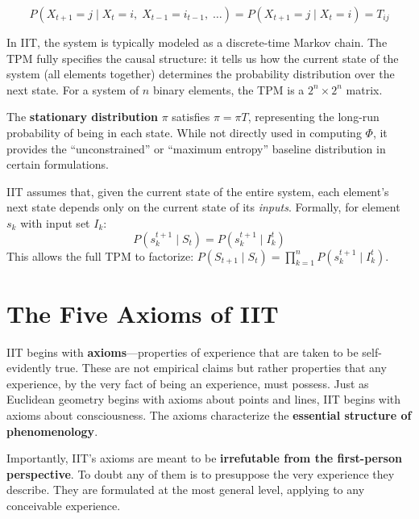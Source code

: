 \documentclass[11pt,a4paper]{report}
\newcommand{\Phi}{\varPhi}
\begin{document}
\begin{mathbox}
\vspace{-8pt}
\[
  P(X_{t+1} = j \mid X_t = i,\; X_{t-1} = i_{t-1},\; \ldots) = P(X_{t+1} = j \mid X_t = i) = T_{ij}
\]
\vspace{-10pt}
\end{mathbox}

In IIT, the system is typically modeled as a discrete-time Markov chain. The TPM fully specifies the causal structure: it tells us how the current state of the system (all elements together) determines the probability distribution over the next state. For a system of $n$ binary elements, the TPM is a $2^n \times 2^n$ matrix.

The \textbf{stationary distribution} $\pi$ satisfies $\pi = \pi T$, representing the long-run probability of being in each state. While not directly used in computing $\Phi$, it provides the ``unconstrained'' or ``maximum entropy'' baseline distribution in certain formulations.

\begin{notebox}
IIT assumes that, given the current state of the entire system, each element's next state depends only on the current state of its \emph{inputs}. Formally, for element $s_k$ with input set $I_k$:
\[
  P(s_k^{t+1} \mid S_t) = P(s_k^{t+1} \mid I_k^t)
\]
This allows the full TPM to factorize: $P(S_{t+1} \mid S_t) = \prod_{k=1}^{n} P(s_k^{t+1} \mid I_k^t)$.
\end{notebox}


\chapter{The Five Axioms of IIT}

IIT begins with \textbf{axioms}---properties of experience that are taken to be self-evidently true. These are not empirical claims but rather properties that any experience, by the very fact of being an experience, must possess. Just as Euclidean geometry begins with axioms about points and lines, IIT begins with axioms about consciousness. The axioms characterize the \textbf{essential structure of phenomenology}.

Importantly, IIT's axioms are meant to be \textbf{irrefutable from the first-person perspective}. To doubt any of them is to presuppose the very experience they describe. They are formulated at the most general level, applying to any conceivable experience.
\end{document}
